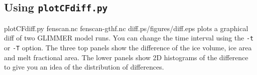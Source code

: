 \subsection{Using \texttt{plotCFdiff.py}}
\begin{pycf}{plotCFdiff.py fenscan.nc fenscan-gthf.nc diff.ps}{\dir/figures/diff.eps}
plots a graphical diff of two GLIMMER model runs. You can change the time interval using the \texttt{-t} or \texttt{-T} option. The three top panels show the difference of the ice volume, ice area and melt fractional area. The lower panels show 2D histograms of the difference to give you an idea of the distribution of differences.
\end{pycf}
